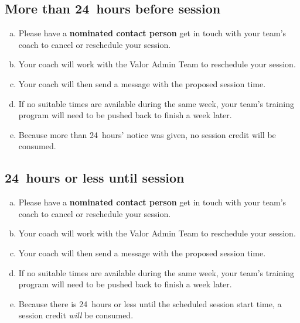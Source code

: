 \documentclass[10pt]{article}
\begin{document}
\subsection{More than 24~hours before session}
\begin{enumerate}[(a)]
\item
Please have a \textbf{nominated contact person} get in touch with your team's coach to cancel or reschedule your session.

\item
Your coach will work with the Valor Admin Team to reschedule your session.

\item
Your coach will then send a message with the proposed session time.

\item
If no suitable times are available during the same week, your team's training program will need to be pushed back to finish a week later.

\item
Because more than 24~hours' notice was given, no session credit will be consumed.
\end{enumerate}

\subsection{24~hours or less until session}
\begin{enumerate}[(a)]
\item
Please have a \textbf{nominated contact person} get in touch with your team's coach to cancel or reschedule your session.

\item
Your coach will work with the Valor Admin Team to reschedule your session.

\item
Your coach will then send a message with the proposed session time.

\item
If no suitable times are available during the same week, your team's training program will need to be pushed back to finish a week later.

\item
Because there is 24~hours or less until the scheduled session start time, a session credit \textit{will} be consumed.
\end{enumerate}
\end{document}
